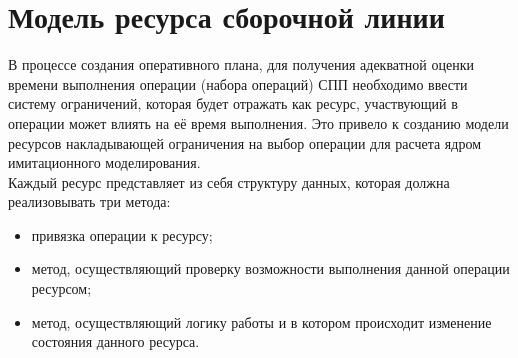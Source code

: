 \section{Модель ресурса сборочной линии}
\indent В процессе создания оперативного плана, для получения адекватной оценки времени выполнения операции (набора операций) СПП необходимо ввести систему ограничений, которая будет отражать как ресурс, участвующий в операции может влиять на её время выполнения.
Это привело к созданию модели ресурсов накладывающей ограничения на выбор операции для расчета ядром имитационного моделирования.\\
\indent Каждый ресурс представляет из себя структуру данных, которая должна реализовывать три метода:
\begin{itemize}
	\item привязка операции к ресурсу;
	\item метод, осуществляющий проверку возможности выполнения данной операции ресурсом;
	\item метод, осуществляющий логику работы и в котором происходит изменение состояния данного ресурса.
\end{itemize}

